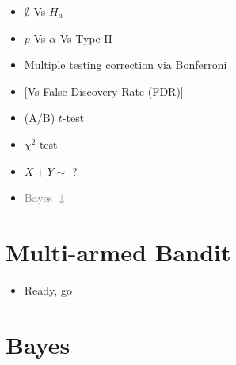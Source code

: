 \documentclass[11pt, oneside]{article}
\begin{document}
\begin{minipage}{.5\linewidth}
\begin{itemize}
\item $\emptyset$ Vs $H_a$
\item $p$ Vs $\alpha$ Vs Type II 
\item Multiple testing correction via Bonferroni 
\item[] {[}Vs False Discovery Rate (FDR){]}
\end{itemize}
\end{minipage}
\begin{minipage}{.25\linewidth}
\begin{itemize}
\item (A/B) $t$-test
\item $\chi^2$-test
\item $X+Y \sim$ ?
\item \textcolor{gray}{Bayes $\downarrow$}
\end{itemize}
\end{minipage}


\section{Multi-armed Bandit}
\begin{itemize}
\item Ready, go
\end{itemize}


\section{Bayes}
\end{document}
